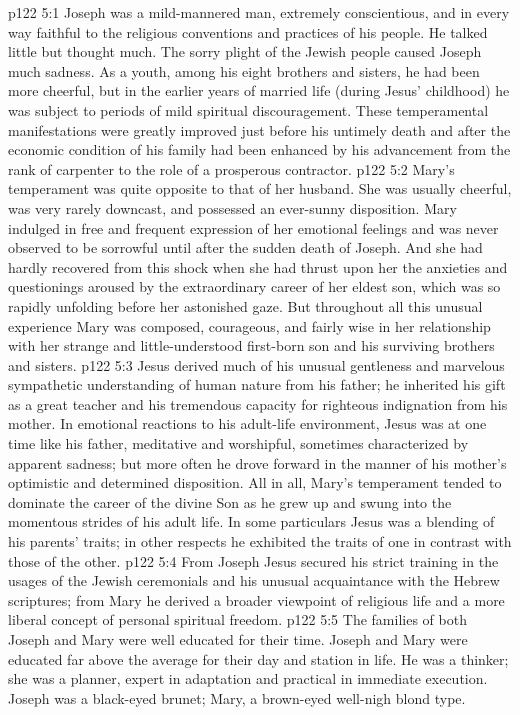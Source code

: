 \vs p122 5:1 Joseph was a mild\hyp{}mannered man, extremely conscientious, and in every way faithful to the religious conventions and practices of his people. He talked little but thought much. The sorry plight of the Jewish people caused Joseph much sadness. As a youth, among his eight brothers and sisters, he had been more cheerful, but in the earlier years of married life (during Jesus’ childhood) he was subject to periods of mild spiritual discouragement. These temperamental manifestations were greatly improved just before his untimely death and after the economic condition of his family had been enhanced by his advancement from the rank of carpenter to the role of a prosperous contractor.\plusone
\vs p122 5:2 Mary’s temperament was quite opposite to that of her husband. She was usually cheerful, was very rarely downcast, and possessed an ever\hyp{}sunny disposition. Mary indulged in free and frequent expression of her emotional feelings and was never observed to be sorrowful until after the sudden death of Joseph. And she had hardly recovered from this shock when she had thrust upon her the anxieties and questionings aroused by the extraordinary career of her eldest son, which was so rapidly unfolding before her astonished gaze. But throughout all this unusual experience Mary was composed, courageous, and fairly wise in her relationship with her strange and little\hyp{}understood first\hyp{}born son and his surviving brothers and sisters.
\vs p122 5:3 Jesus derived much of his unusual gentleness and marvelous sympathetic understanding of human nature from his father; he inherited his gift as a great teacher and his tremendous capacity for righteous indignation from his mother. In emotional reactions to his adult\hyp{}life environment, Jesus was at one time like his father, meditative and worshipful, sometimes characterized by apparent sadness; but more often he drove forward in the manner of his mother’s optimistic and determined disposition. All in all, Mary’s temperament tended to dominate the career of the divine Son as he grew up and swung into the momentous strides of his adult life. In some particulars Jesus was a blending of his parents’ traits; in other respects he exhibited the traits of one in contrast with those of the other.
\vs p122 5:4 From Joseph Jesus secured his strict training in the usages of the Jewish ceremonials and his unusual acquaintance with the Hebrew scriptures; from Mary he derived a broader viewpoint of religious life and a more liberal concept of personal spiritual freedom.
\vs p122 5:5 The families of both Joseph and Mary were well educated for their time. Joseph and Mary were educated far above the average for their day and station in life. He was a thinker; she was a planner, expert in adaptation and practical in immediate execution. Joseph was a black\hyp{}eyed brunet; Mary, a brown\hyp{}eyed well\hyp{}nigh blond type.
